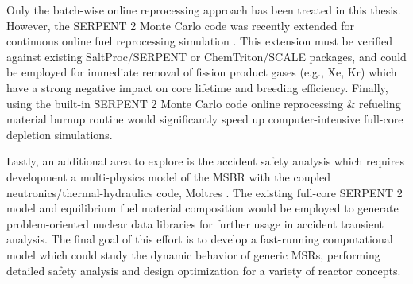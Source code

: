 Only the batch-wise online reprocessing approach has been treated in this thesis. However, the SERPENT 2 Monte Carlo code was recently extended for continuous online fuel reprocessing simulation \cite{aufiero_extended_2013}. This extension must be verified against existing SaltProc/SERPENT or ChemTriton/SCALE packages, and could be employed for immediate removal of fission product gases (e.g., Xe, Kr) which have a strong negative impact on core lifetime and breeding efficiency. Finally, using the built-in SERPENT 2 Monte Carlo code online reprocessing \& refueling material burnup routine would significantly speed up computer-intensive full-core depletion simulations.

Lastly, an additional area to explore is the accident safety analysis which requires development a multi-physics model of the \gls{MSBR} with the coupled neutronics/thermal-hydraulics code, Moltres \cite{lindsay_introduction_2018}. The existing full-core SERPENT 2 model and equilibrium fuel material composition would be employed to generate problem-oriented nuclear data libraries for further usage in accident transient analysis. The final goal of this effort is to develop a fast-running computational model which could study the dynamic behavior of generic \glspl{MSR}, performing detailed safety analysis and design optimization for a variety of reactor concepts.
